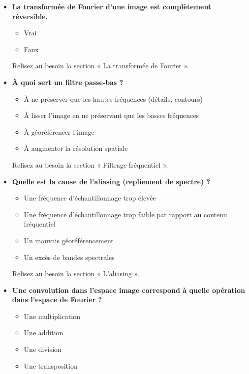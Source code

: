 \documentclass[
  french,
  11pt,
  letterpaper,
  open=any,
  twoside=false,
  french]{scrbook}
\providecommand{\tightlist}{%
  \setlength{\itemsep}{0pt}\setlength{\parskip}{0pt}}
\begin{document}
\begin{itemize}
\item
  \textbf{La transformée de Fourier d'une image est complètement
  réversible.}

  \begin{itemize}
  \tightlist
  \item
    Vrai
  \item
    Faux
  \end{itemize}

  Relisez au besoin la section « La transformée de Fourier ».
\item
  \textbf{À quoi sert un filtre passe-bas ?}

  \begin{itemize}
  \tightlist
  \item
    À ne préserver que les hautes fréquences (détails, contours)
  \item
    À lisser l'image en ne préservant que les basses fréquences
  \item
    À géoréférencer l'image
  \item
    À augmenter la résolution spatiale
  \end{itemize}

  Relisez au besoin la section « Filtrage fréquentiel ».
\item
  \textbf{Quelle est la cause de l'aliasing (repliement de spectre) ?}

  \begin{itemize}
  \tightlist
  \item
    Une fréquence d'échantillonnage trop élevée
  \item
    Une fréquence d'échantillonnage trop faible par rapport au contenu
    fréquentiel
  \item
    Un mauvais géoréférencement
  \item
    Un excès de bandes spectrales
  \end{itemize}

  Relisez au besoin la section « L'aliasing ».
\item
  \textbf{Une convolution dans l'espace image correspond à quelle
  opération dans l'espace de Fourier ?}

  \begin{itemize}
  \tightlist
  \item
    Une multiplication
  \item
    Une addition
  \item
    Une division
  \item
    Une transposition
  \end{itemize}


\end{itemize}
\end{document}
